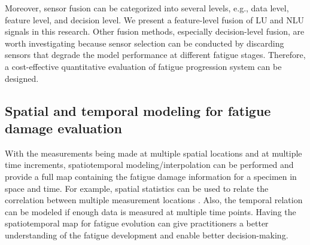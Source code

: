 Moreover, sensor fusion can be categorized into several levels, e.g., data level, feature level, and decision level. We present a feature-level fusion of LU and NLU signals in this research. Other fusion methods, especially decision-level fusion, are worth investigating because sensor selection can be conducted by discarding sensors that degrade the model performance at different fatigue stages. Therefore, a cost-effective quantitative evaluation of fatigue progression system can be designed.

\subsection{Spatial and temporal modeling for fatigue damage evaluation}

With the measurements being made at multiple spatial locations and at multiple time increments, spatiotemporal modeling/interpolation can be performed and provide a full map containing the fatigue damage information for a specimen in space and time. For example, spatial statistics can be used to relate the correlation between multiple measurement locations \cite{dynamic-sampling-Shao,yuhang,CHEN2021306}. Also, the temporal relation can be modeled if enough data is measured at multiple time points. Having the spatiotemporal map for fatigue evolution can give practitioners a better understanding of the fatigue development and enable better decision-making.